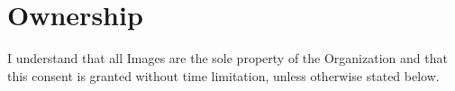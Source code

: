 
\section{Ownership}
\label{sec:ownership}

I understand that all Images are the sole property of the Organization and that this consent is granted without time limitation, unless otherwise stated below.

